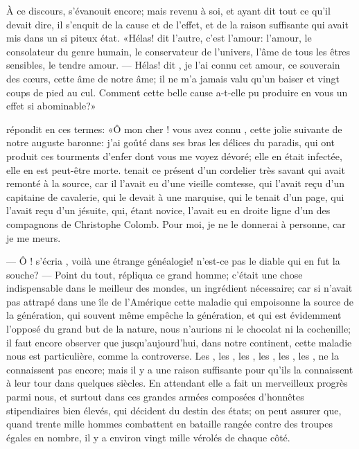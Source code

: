 À ce discours,  s’évanouit encore; mais revenu à soi, et ayant
dit tout ce qu’il devait dire, il s’enquit de la cause et de l’effet,
et de la raison suffisante qui avait mis  dans un si piteux
état. «Hélas! dit l’autre, c’est l’amour: l’amour, le consolateur du
genre humain, le conservateur de l’univers, l’âme de tous les êtres
sensibles, le tendre amour. — Hélas! dit , je l’ai connu cet
amour, ce souverain des cœurs, cette âme de notre âme; il ne m’a
jamais valu qu’un baiser et vingt coups de pied au cul. Comment cette
belle cause a-t-elle pu produire en vous un effet si abominable?»

 répondit en ces termes: «Ô mon cher ! vous avez connu
, cette jolie suivante de notre auguste baronne: j’ai goûté
dans ses bras les délices du paradis, qui ont produit ces tourments
d’enfer dont vous me voyez dévoré; elle en était infectée, elle en est
peut-être morte.  tenait ce présent d’un cordelier très savant
qui avait remonté à la source, car il l’avait eu d’une vieille
comtesse, qui l’avait reçu d’un capitaine de cavalerie, qui le devait à
une marquise, qui le tenait d’un page, qui l’avait reçu d’un jésuite,
qui, étant novice, l’avait eu en droite ligne d’un des compagnons de
Christophe Colomb. Pour moi, je ne le donnerai à personne, car je me
meurs.


— Ô ! s’écria , voilà une étrange généalogie! n’est-ce pas
le diable qui en fut la souche? — Point du tout, répliqua ce grand homme;
c’était une chose indispensable dans le meilleur des mondes, un
ingrédient nécessaire; car si  n’avait pas attrapé dans une île
de \mbox{l’Amérique} cette maladie qui empoisonne la source de la
génération,
 qui souvent même empêche la génération, et qui est
évidemment l’opposé du grand but de la nature, nous n’aurions ni le
chocolat ni la cochenille; il faut encore observer que
jusqu’aujourd’hui, dans notre continent, cette maladie nous est
particulière, comme la controverse. Les , les , les
, les , les , les , ne la connaissent pas
encore; mais il y a une raison suffisante pour qu’ils la connaissent à
leur tour dans quelques siècles. En attendant elle a fait un
merveilleux progrès parmi nous, et surtout dans ces grandes armées
composées d’honnêtes stipendiaires bien élevés, qui décident du destin
des états; on peut assurer que, quand trente mille hommes combattent en
bataille rangée contre des troupes égales en nombre, il y a environ
vingt mille vérolés de chaque côté.

